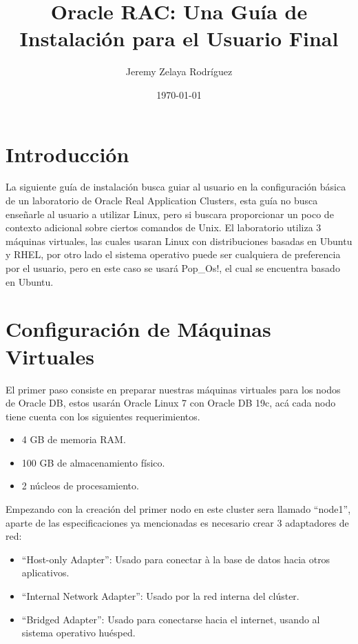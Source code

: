 \documentclass{article}
\begin{document}
\title{Oracle RAC: Una Guía de Instalación para el Usuario Final}
\author{Jeremy Zelaya Rodríguez}

\date{\today} 

\maketitle
\tableofcontents

\section{Introducción}

La siguiente guía de instalación busca guiar al usuario en la configuración básica de un laboratorio de Oracle Real Application Clusters, esta guía no busca enseñarle al usuario a utilizar Linux, pero si buscara proporcionar un poco de contexto adicional sobre ciertos comandos de Unix. El laboratorio utiliza 3 máquinas virtuales, las cuales usaran Linux con distribuciones basadas en Ubuntu y RHEL, por otro lado el sistema operativo puede ser cualquiera de preferencia por el usuario, pero en este caso se usará Pop\_Os!, el cual se encuentra basado en Ubuntu.

\section{Configuración de Máquinas Virtuales}

El primer paso consiste en preparar nuestras máquinas virtuales para los nodos de Oracle DB, estos usarán Oracle Linux 7 con Oracle DB 19c, acá cada nodo tiene cuenta con los siguientes requerimientos.

\begin{itemize}
	\item 4 GB de memoria RAM.
	\item 100 GB de almacenamiento físico.
	\item 2 núcleos de procesamiento.
\end{itemize}

Empezando con la creación del primer nodo en este cluster sera llamado ``node1'', aparte de las especificaciones ya mencionadas es necesario crear 3 adaptadores de red:

\begin{itemize}
	\item ``Host-only Adapter'': Usado para conectar à la base de datos hacia otros aplicativos.
	\item ``Internal Network Adapter'': Usado por la red interna del clúster.
	\item ``Bridged Adapter'': Usado para conectarse hacia el internet, usando al sistema operativo huésped.
\end{itemize}
\end{document}
